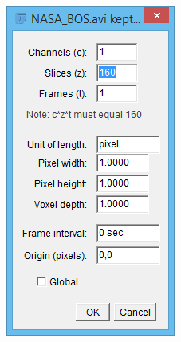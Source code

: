 \documentclass[letterpaper,12pt]{article}
\begin{document}
\begin{figure}[h]
    \centering
    \begin{subfigure}[b]{0.25\textwidth}
        \includegraphics[width=\textwidth]{Image_Properties_Initial.PNG}
        \caption{}
        \label{fig:Image_Properties_Initial}

\end{subfigure}
\end{figure}
\end{document}
